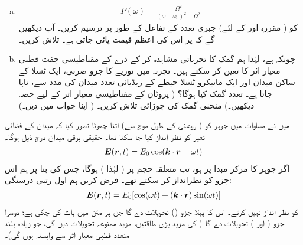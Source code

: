 \begin{enumerate}[a.]
 
\item
{}
\begin{align}
	P(\omega) = \frac{\Omega^2}{(\omega-\omega_0)^2+\Omega^2}
\end{align}
کو ( مقررہ  اور  کے لئے) جبری تعدد  کے تفاعل کے طور پر ترسیم کریں۔ آپ دیکھیں گے کہ  پر اس کی اعظم قیمت پائی جاتی ہے۔  تلاش کریں۔
\item
 چونکہ  ہے، لہٰذا ہم گمک کا تجرباتی مشاہدہ کر کے ذرے کے مقناطیسی جفت قطبی معیار اثر کا تعین کر سکتے ہیں۔  تجربہ میں نوریے کا  جزو ضربی، ایک ٹسلا کے ساکن میدان اور ایک مائیکرو ٹسلا  حیطے کے ریڈیائی تعدد میدان کی مدد سے، ناپا جاتا ہے۔ تعدد گمک کیا ہوگا؟ ( پروٹان کے مقناطیسی معیار اثر کے لیے حصہ  دیکھیں۔) منحنی گمک کی چوڑائی تلاش کریں۔ ( اپنا جواب  میں دیں۔)
 \end{enumerate}
میں نے مساوات  میں جوہر کو ( روشنی کے طول موج سے) اتنا چھوٹا تصور کیا کہ میدان کے فضائی تغیر کو نظر انداز کیا جا سکتا تھا۔ حقیقی برقی میدان درج ذیل ہوگا۔
\begin{align}
{\ensuremath{{\boldsymbol{E}}}}({{\boldsymbol{r}}},t) = E_0\cos({{\boldsymbol{k}}}\cdot {\ensuremath{{\boldsymbol{r}}}}-\omega t)
\end{align}
اگر جوہر کا مرکز مبدا پر ہو، تب متعلقہ حجم پر  
( لہٰذا  ) ہوگا، جس کی بنا پر ہم اس جزو کو نظرانداز کر سکتے تھے۔ فرض کریں ہم اول رتبی درستگی:
\begin{align}
{\ensuremath{{\boldsymbol{E}}}}({{\boldsymbol{r}}},t) = E_0[\cos(\omega t)+({{\boldsymbol{k}}}\cdot{\ensuremath{{\boldsymbol{r}}}})\sin(\omega t)]
\end{align}
کو نظر انداز نہیں کرتے۔ اس کا پہلا جزو  ()  تحویلات دے گا جن پر متن میں بات کی چکی ہے؛ دوسرا جزو  (  اور ) تحویلات دے گا (  کی مزید بڑی طاقتیں، مزید ممنوعہ تحویلات دیں گی، جو زیادہ بلند متعدد قطبی معیار اثر سے وابستہ ہوں گی)۔
